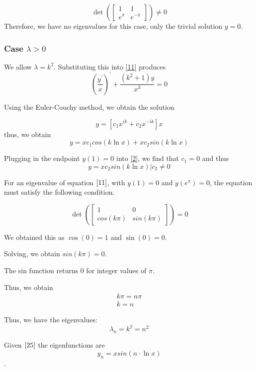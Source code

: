 \documentclass{article}
\begin{document}
$$\det \left( \begin{bmatrix} 1 & 1 \\ e^{\pi} & e^{-\pi} \end{bmatrix} \right) \neq 0$$
Therefore, we have no eigenvalues for this case, only the trivial solution $y=0$.

\subsubsection*{Case $\lambda > 0$}

We allow $\lambda = k^2$.
Substituting this into \eqref{11} produces
$$ \left(\frac{y^{'}}{x}\right)^{'} + \frac{\left(k^2 + 1\right)y}{x^3} = 0 $$

Using the Euler-Couchy method, we obtain the solution

$$ y= \left[ c_1 x^{ik} + c_2 x^{-ik}\right] x $$
thus, we obtain
\begin{equation}\label{2}y = x c_1 cos\left(k \ln x \right) + x c_2 sin\left( k \ln x \right)\end{equation}

Plugging in the endpoint $y(1)=0$ into \eqref{2}, we find that $c_1=0$ and thus
\begin{equation}\label{25}
y = x c_2 sin\left(k \ln x \right)\Bigr| c_2 \neq 0
\end{equation}

For an eigenvalue of equation $\eqref{11}$, with $y(1) = 0$ and $y(e^\pi) = 0$, the equation must satisfy the following condition.

$$
\det \left( \begin{bmatrix} 1 & 0 \\ cos(k\pi) & sin(k\pi) \end{bmatrix} \right) = 0
$$

We obtained this as $\cos(0) = 1$ and $\sin(0) = 0$.

Solving, we obtain $sin(k\pi) = 0$.

The sin function returns 0 for integer values of $\pi$.

Thus, we obtain
\begin{align*}k\pi = n\pi \\
k = n
\end{align*}

Thus, we have the eigenvalues:
$$\lambda_{n} = k^2 = n^2$$

Given $\eqref{25}$ the eigenfunctions are
$$ y_n = x sin \left( n\cdot \ln x \right ) $$.

\pagebreak
\end{document}
